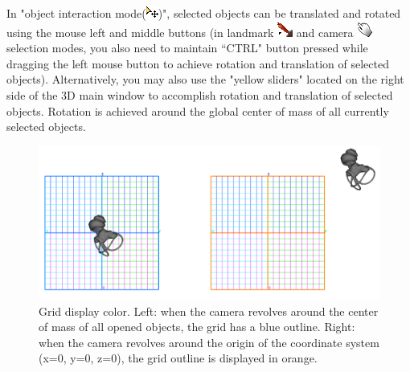 \documentclass[12pt, a4paper]{book}
\begin{document}
In "object interaction mode(\includegraphics[scale=0.7]{../images/04/move_mode.png})", selected objects can be translated and rotated using the mouse left and middle buttons (in landmark \includegraphics[scale=0.7]{../images/04/Landmarks2.png} and camera  \includegraphics[scale=0.7]{../images/04/camera_mode.png} selection modes, you also need to maintain ``CTRL" button pressed while dragging the left mouse button to achieve rotation and translation of selected objects). Alternatively, you may also use the "yellow sliders" located on the right side of the 3D main window to accomplish rotation and translation of selected objects. Rotation is achieved around the global center of mass of all currently selected objects.\\
\begin{figure}
  \centering
  \includegraphics[scale=0.3]{grid.png} 
	\caption{Grid display color.  Left: when the camera revolves around the center of mass of all opened objects, the grid has a blue outline. Right: when the camera revolves around the origin of the coordinate system (x=0, y=0, z=0), the grid outline is displayed in orange.}
\label{grid_color}
 
\end{figure}
\end{document}
